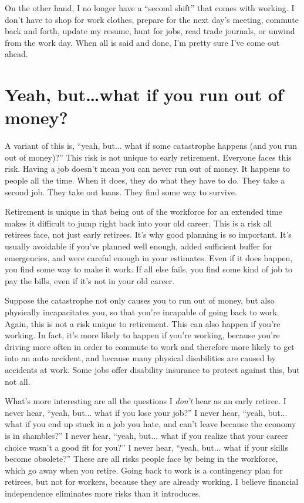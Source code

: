 On the other hand, I no longer have a ``second shift'' that comes with working. I don't have to shop for work clothes, prepare for the next day's meeting, commute back and forth, update my resume, hunt for jobs, read trade journals, or unwind from the work day. When all is said and done, I'm pretty sure I've come out ahead.

\section{Yeah, but\ldots what if you run out of money?}
A variant of this is, ``yeah, but... what if some catastrophe happens (and you run out of money)?'' This risk is not unique to early retirement. Everyone faces this risk. Having a job doesn't mean you can never run out of money. It happens to people all the time. When it does, they do what they have to do. They take a second job. They take out loans. They find some way to survive.

Retirement is unique in that being out of the workforce for an extended time makes it difficult to jump right back into your old career. This is a risk all retirees face, not just early retirees. It's why good planning is so important. It's usually avoidable if you've planned well enough, added sufficient buffer for emergencies, and were careful enough in your estimates. Even if it does happen, you find some way to make it work. If all else fails, you find some kind of job to pay the bills, even if it's not in your old career.

Suppose the catastrophe not only causes you to run out of money, but also physically incapacitates you, so that you're incapable of going back to work. Again, this is not a risk unique to retirement. This can also happen if you're working. In fact, it's more likely to happen if you're working, because you're driving more often in order to commute to work and therefore more likely to get into an auto accident, and because many physical disabilities are caused by accidents at work. Some jobs offer disability insurance to protect against this, but not all.

What's more interesting are all the questions I \emph{don't} hear as an early retiree. I never hear, ``yeah, but... what if you lose your job?'' I never hear, ``yeah, but... what if you end up stuck in a job you hate, and can't leave because the economy is in shambles?'' I never hear, ``yeah, but... what if you realize that your career choice wasn't a good fit for you?'' I never hear, ``yeah, but... what if your skills become obsolete?'' These are all risks people face by being in the workforce, which go away when you retire. Going back to work is a contingency plan for retirees, but not for workers, because they are already working. I believe financial independence eliminates more risks than it introduces.

